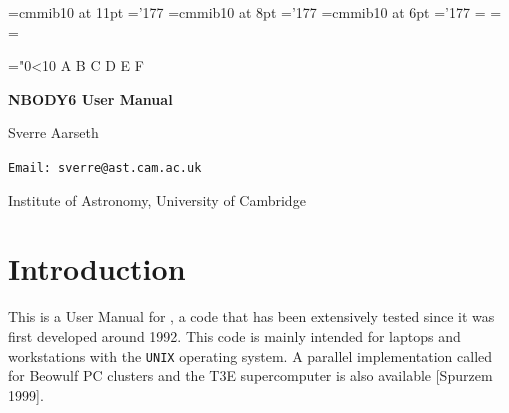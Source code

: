 \documentclass[12pt]{article}
\begin{document}
\def\AJ{{\it Astron. J.} }
\def\APJ{{\it Astrophys. J.} }
\def\ApJ{{\it Astrophys. J.} }
\def\MN{{\it Mon. Not. R. Astron. Soc.} }
\def\AA{{\it Astron. Astrophys.} }
\def\CM{{\it Celes. Mech.} }
\def\CMD{{\it Celes. Mech. Dyn. Ast.} }
\def\PASJ{{\it Publ. Astron. Soc. Japan} }
\def\SJA{S.J. Aarseth}
\def\SAA{S.J. Aarseth }


\font\elevenmib=cmmib10 at 11pt \skewchar\elevenmib='177
\font\eightmib=cmmib10 at 8pt   \skewchar\eightmib='177
\font\sixmib=cmmib10 at 6pt     \skewchar\sixmib='177
%
\newfam\mibfam
\textfont\mibfam=\elevenmib
\scriptfont\mibfam=\eightmib
\scriptscriptfont\mibfam=\sixmib

\def\hexnum#1{\ifnum#1<10 \number#1\else
 \ifnum#1=10 A\else\ifnum#1=11 B\else\ifnum#1=12 C\else
 \ifnum#1=13 D\else\ifnum#1=14 E\else\ifnum#1=15 F\fi\fi\fi\fi\fi\fi\fi}
\def\mib{\hexnum\mibfam}

\mathchardef\bmu="0\mib16

 
 
\centerline {\Large {\bf {NBODY6 User Manual~~~~}}}
\bigskip
\centerline {\Large {Sverre Aarseth~~~}}
\bigskip
\centerline {\large {\tt Email: sverre@ast.cam.ac.uk}~~~~~}
\bigskip
\centerline {\large {Institute of Astronomy, University of Cambridge~~~~}}
\medskip
\bigskip
\section{Introduction}

This is a User Manual for {}, a code that has been extensively
tested since it was first developed around 1992.
This code is mainly intended for laptops and workstations with the {\tt UNIX}
operating system.
A parallel implementation called {} for Beowulf PC
clusters and the T3E supercomputer is also available [Spurzem 1999].
\end{document}
